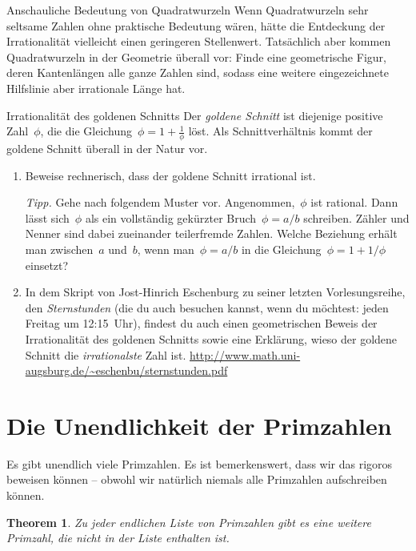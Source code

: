 \documentclass[twoside]{../zirkelblatt1415}
\theoremstyle{definition}
\theoremstyle{plain}
\newtheorem{thm}[defn]{Theorem}
\theoremstyle{remark}
\begin{document}
\begin{aufgabe}{Anschauliche Bedeutung von Quadratwurzeln}
Wenn Quadratwurzeln sehr seltsame Zahlen ohne praktische Bedeutung wären,
hätte die Entdeckung der Irrationalität vielleicht einen geringeren
Stellenwert. Tatsächlich aber kommen Quadratwurzeln in der
Geometrie überall vor: Finde eine geometrische Figur, deren Kantenlängen alle
ganze Zahlen sind, sodass eine weitere eingezeichnete Hilfslinie aber
irrationale Länge hat.
\end{aufgabe}

\begin{aufgabe}{Irrationalität des goldenen Schnitts}
Der \emph{goldene Schnitt} ist diejenige positive Zahl~$\phi$, die die
Gleichung~$\phi = 1 + \frac{1}{\phi}$ löst. Als Schnittverhältnis kommt der goldene
Schnitt überall in der Natur vor.

\begin{enumerate}
\item Beweise rechnerisch, dass der goldene Schnitt irrational ist.

\emph{Tipp.} Gehe nach folgendem Muster vor. Angenommen,~$\phi$ ist rational.
Dann lässt sich~$\phi$ als ein vollständig gekürzter Bruch~$\phi = a/b$
schreiben. Zähler und Nenner sind dabei zueinander teilerfremde Zahlen. Welche
Beziehung erhält man zwischen~$a$ und~$b$, wenn man~$\phi = a/b$ in die
Gleichung~$\phi = 1 + 1/\phi$ einsetzt?

\item In dem Skript von Jost-Hinrich Eschenburg zu seiner letzten
Vorlesungsreihe, den \emph{Sternstunden} (die du auch besuchen kannst, wenn du
möchtest: jeden Freitag um 12:15~Uhr), findest du auch einen geometrischen
Beweis der Irrationalität des goldenen Schnitts sowie eine Erklärung, wieso der
goldene Schnitt die \emph{irrationalste} Zahl ist.
\url{http://www.math.uni-augsburg.de/~eschenbu/sternstunden.pdf}
\end{enumerate}\fixlistspacing
\end{aufgabe}


\section{Die Unendlichkeit der Primzahlen}

Es gibt unendlich viele Primzahlen. Es ist bemerkenswert, dass wir das rigoros
beweisen können -- obwohl wir natürlich niemals alle Primzahlen aufschreiben
können.

\begin{thm}Zu jeder endlichen Liste von Primzahlen gibt es eine weitere
Primzahl, die nicht in der Liste enthalten ist.\end{thm}
\end{document}
